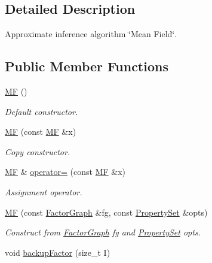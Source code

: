 \subsection{Detailed Description}
Approximate inference algorithm \char`\"{}Mean Field\char`\"{}. \subsection*{Public Member Functions}
\begin{CompactItemize}
\item 
\hypertarget{classdai_1_1MF_2e40d786c9e8d34864fe09e1da56632c}{
\hyperlink{classdai_1_1MF_2e40d786c9e8d34864fe09e1da56632c}{MF} ()}
\label{classdai_1_1MF_2e40d786c9e8d34864fe09e1da56632c}

\begin{CompactList}\small\item\em Default constructor. \item\end{CompactList}\item 
\hypertarget{classdai_1_1MF_813ea21faea74d26067ac0876d2f89d6}{
\hyperlink{classdai_1_1MF_813ea21faea74d26067ac0876d2f89d6}{MF} (const \hyperlink{classdai_1_1MF}{MF} \&x)}
\label{classdai_1_1MF_813ea21faea74d26067ac0876d2f89d6}

\begin{CompactList}\small\item\em Copy constructor. \item\end{CompactList}\item 
\hypertarget{classdai_1_1MF_d8f30354060027fbb96f303947163dbc}{
\hyperlink{classdai_1_1MF}{MF} \& \hyperlink{classdai_1_1MF_d8f30354060027fbb96f303947163dbc}{operator=} (const \hyperlink{classdai_1_1MF}{MF} \&x)}
\label{classdai_1_1MF_d8f30354060027fbb96f303947163dbc}

\begin{CompactList}\small\item\em Assignment operator. \item\end{CompactList}\item 
\hypertarget{classdai_1_1MF_968fe2b9d9cc604a9d81c9ea15be8d72}{
\hyperlink{classdai_1_1MF_968fe2b9d9cc604a9d81c9ea15be8d72}{MF} (const \hyperlink{classdai_1_1FactorGraph}{FactorGraph} \&fg, const \hyperlink{classdai_1_1PropertySet}{PropertySet} \&opts)}
\label{classdai_1_1MF_968fe2b9d9cc604a9d81c9ea15be8d72}

\begin{CompactList}\small\item\em Construct from \hyperlink{classdai_1_1FactorGraph}{FactorGraph} fg and \hyperlink{classdai_1_1PropertySet}{PropertySet} opts. \item\end{CompactList}\item 
\hypertarget{classdai_1_1DAIAlg_48ba6a58d10b8802d690e5e92ec5abe9}{
void \hyperlink{classdai_1_1DAIAlg_48ba6a58d10b8802d690e5e92ec5abe9}{backupFactor} (size\_\-t I)}
\label{classdai_1_1DAIAlg_48ba6a58d10b8802d690e5e92ec5abe9}


\end{CompactItemize}

